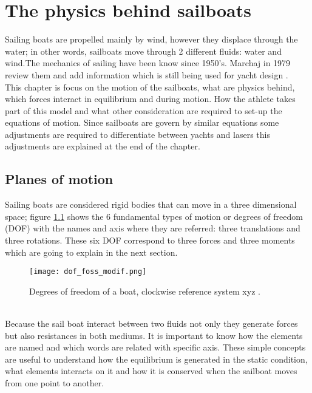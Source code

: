 \chapter{The physics behind sailboats}


Sailing boats are propelled mainly by wind, however they displace through the water; in other words, sailboats move through 2 different fluids: water and wind.The mechanics of sailing have been know since 1950's.  Marchaj in 1979 review them and add information which is still being used for yacht design \cite{marchajaereo1979}.
\\

This chapter is focus on the motion of the sailboats, what are physics behind, which forces interact in equilibrium and during motion. How the athlete takes part of this model and what other consideration are required to set-up the equations of motion. Since sailboats are govern by similar equations some adjustments are required to differentiate between yachts and lasers this adjustments are explained at the end of the chapter.

\section{Planes of motion}
Sailing boats are considered rigid bodies that can move in a three dimensional space;
figure \ref{DOF} shows the 6 fundamental types of motion or degrees of freedom (DOF)  with the names and axis where they are referred: three translations and three rotations. These six DOF correspond to three forces and three moments which are going to explain in the next section. \\
\begin{figure}[ht]
\centering
  \texttt{[image: dof\_foss\_modif.png]}
 \caption{Degrees of freedom of a boat, clockwise reference system xyz \cite{fossati2009aero}. }
\label{DOF}
\end{figure}
\\
Because the sail boat interact between two fluids not only they generate forces but also resistances in both mediums. It is important to know how the elements are named and which words are related with specific axis.  These simple concepts are useful to understand how the equilibrium is generated in the static condition, what elements interacts on it and how it is conserved when the sailboat moves from one point to another. 

